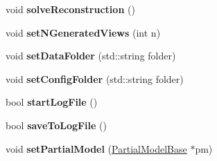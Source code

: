 \begin{DoxyCompactItemize}
\item 
void {\bfseries solve\+Reconstruction} ()\hypertarget{classReconstructor3D_ab45520b4bd55fbd6fc222aae759b8f0c}{}\label{classReconstructor3D_ab45520b4bd55fbd6fc222aae759b8f0c}

\item 
void {\bfseries set\+N\+Generated\+Views} (int n)\hypertarget{classReconstructor3D_a56b79062b049931f767f2d6451bfab3b}{}\label{classReconstructor3D_a56b79062b049931f767f2d6451bfab3b}

\item 
void {\bfseries set\+Data\+Folder} (std\+::string folder)\hypertarget{classReconstructor3D_a5cc843ea32ec0152a059318c47728d12}{}\label{classReconstructor3D_a5cc843ea32ec0152a059318c47728d12}

\item 
void {\bfseries set\+Config\+Folder} (std\+::string folder)\hypertarget{classReconstructor3D_ad41a7a58bff926bb2162ae55f850e011}{}\label{classReconstructor3D_ad41a7a58bff926bb2162ae55f850e011}

\item 
bool {\bfseries start\+Log\+File} ()\hypertarget{classReconstructor3D_a3d69e32e5f51b48437220ce61390a993}{}\label{classReconstructor3D_a3d69e32e5f51b48437220ce61390a993}

\item 
bool {\bfseries save\+To\+Log\+File} ()\hypertarget{classReconstructor3D_a3919d24a3df7aa41da8b0d273c50b1db}{}\label{classReconstructor3D_a3919d24a3df7aa41da8b0d273c50b1db}

\item 
void {\bfseries set\+Partial\+Model} (\hyperlink{classPartialModelBase}{Partial\+Model\+Base} $\ast$pm)\hypertarget{classReconstructor3D_a35c956aaa1e0a4af2bcd0d91e7406cd1}{}\label{classReconstructor3D_a35c956aaa1e0a4af2bcd0d91e7406cd1}

\end{DoxyCompactItemize}
